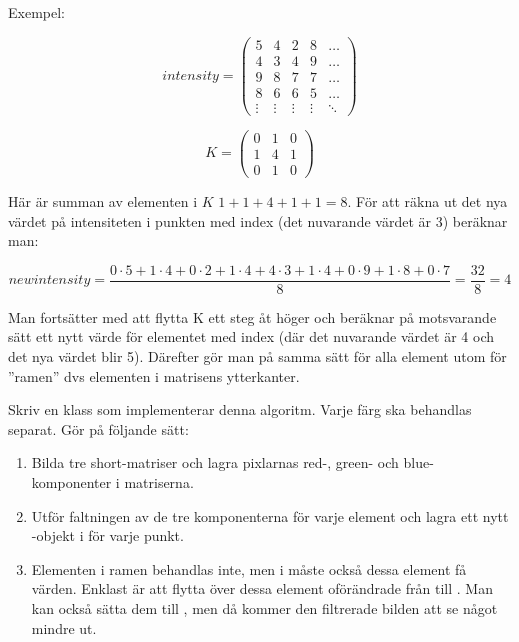 Exempel:

\begin{minipage}{5cm}
\begin{displaymath}
\mathit{intensity} = \left(
\begin{array}{ccccc}
5 & 4 & 2 & 8 & \ldots \\
4 & 3 & 4 & 9 & \ldots \\
9 & 8 & 7 & 7 & \ldots \\
8 & 6 & 6 & 5 & \ldots \\
\vdots & \vdots & \vdots & \vdots & \ddots
\end{array}
\right)
\end{displaymath}
\end{minipage}\hspace{2cm}
\begin{minipage}{5cm}
\begin{displaymath}
K = \left(
\begin{array}{ccc}
0 & 1 & 0 \\
1 & 4 & 1 \\
0 & 1 & 0
\end{array}
\right)
\end{displaymath}
\end{minipage}

Här är summan av elementen i $K$ $1+1+4+1+1 = 8$. För att räkna ut det nya värdet på intensiteten i punkten med index  (det nuvarande värdet är 3) beräknar man:

\begin{displaymath}
\mathit{newintensity} = \frac{0 \cdot 5 + 1 \cdot 4 + 0 \cdot 2 + 1 \cdot 4 + 4 \cdot 3 + 1 \cdot 4 + 0 \cdot 9 + 1 \cdot 8 + 0 \cdot 7}{8} = \frac{32}{8} = 4
\end{displaymath}


Man fortsätter med att flytta K ett steg åt höger och beräknar på motsvarande sätt ett nytt värde för elementet med index  (där det nuvarande värdet är 4 och det nya värdet blir 5). Därefter gör man på samma sätt för alla element utom för ”ramen” dvs elementen i matrisens ytterkanter.

Skriv en klass som implementerar denna algoritm. Varje färg ska behandlas separat. Gör på följande sätt:
\begin{enumerate}
	\item Bilda tre short-matriser och lagra pixlarnas red-, green- och blue-komponenter i matriserna.
	\item Utför faltningen av de tre komponenterna för varje element och lagra ett nytt -objekt i  för varje punkt.
	\item Elementen i ramen behandlas inte, men i  måste också dessa element få värden. Enklast är att flytta över dessa element oförändrade från  till . Man kan också sätta dem till , men då kommer den filtrerade bilden att se något mindre ut.
\end{enumerate}

